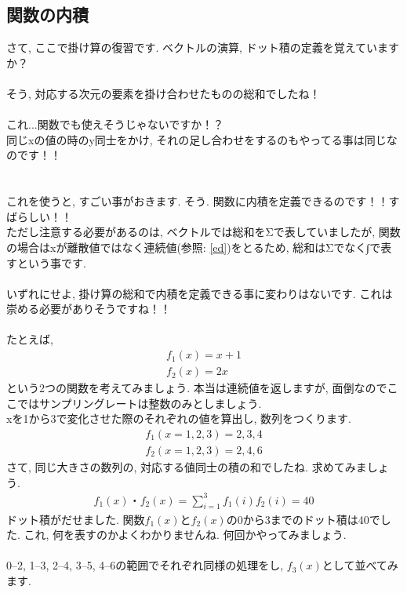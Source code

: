 \documentclass[11pt,a4paper]{jreport}
\begin{document}
\subsection{関数の内積}
さて, ここで掛け算の復習です. ベクトルの演算, ドット積の定義を覚えていますか？\\
\\
そう, 対応する次元の要素を掛け合わせたものの総和でしたね！\\
\\
これ...関数でも使えそうじゃないですか！？\\
同じxの値の時のy同士をかけ, それの足し合わせをするのもやってる事は同じなのです！！\\
\\
\\
これを使うと, すごい事がおきます. そう. 関数に内積を定義できるのです！！すばらしい！！\\
ただし注意する必要があるのは, ベクトルでは総和をΣで表していましたが, 関数の場合はxが離散値ではなく連続値(参照: \ref{ed})をとるため, 総和はΣでなく∫で表すという事です.\\
\\
いずれにせよ, 掛け算の総和で内積を定義できる事に変わりはないです. これは崇める必要がありそうですね！！\\
\\
たとえば, 
\begin{eqnarray}
f_1(x) = x + 1\\
f_2(x) = 2x 
\end{eqnarray}
という2つの関数を考えてみましょう. 本当は連続値を返しますが, 面倒なのでここではサンプリングレートは整数のみとしましょう.\\
xを1から3で変化させた際のそれぞれの値を算出し, 数列をつくります.
\begin{eqnarray}
{f_1(x=1,2,3)} = {2,3,4}\\
{f_2(x=1,2,3) } = {2,4,6}
\end{eqnarray}
さて, 同じ大きさの数列の, 対応する値同士の積の和でしたね. 求めてみましょう.\\
\begin{eqnarray}
f_1(x)・f_2(x) = \sum_{i=1}^{3} f_1(i)f_2(i) =40
\end{eqnarray}
ドット積がだせました. 関数$f_1(x)$と$f_2(x)$の0から3までのドット積は40でした. これ, 何を表すのかよくわかりませんね. 何回かやってみましょう.\\
\\
0--2, 1--3, 2--4, 3--5, 4--6の範囲でそれぞれ同様の処理をし, $f_3(x)$として並べてみます.\\
\end{document}
